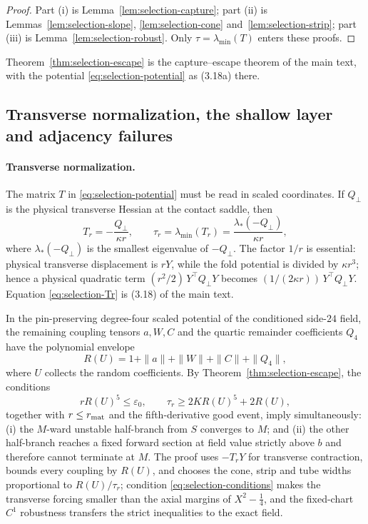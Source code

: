 \begin{proof}
Part (i) is Lemma~\ref{lem:selection-capture}; part (ii) is Lemmas~\ref{lem:selection-slope}, \ref{lem:selection-cone} and~\ref{lem:selection-strip}; part (iii) is Lemma~\ref{lem:selection-robust}. Only $\tau=\lambda_{\min}(T)$ enters these proofs.
\end{proof}

Theorem~\ref{thm:selection-escape} is the capture--escape theorem of the main text, with the potential \eqref{eq:selection-potential} as (3.18a) there.

\subsection{Transverse normalization, the shallow layer and adjacency failures}\label{ssec:selection-adjacency}

\paragraph{Transverse normalization.} The matrix $T$ in \eqref{eq:selection-potential} must be read in scaled coordinates. If $Q_\perp$ is the physical transverse Hessian at the contact saddle, then
\begin{equation}\label{eq:selection-Tr}
T_r=-\frac{Q_\perp}{\kappa r},\qquad\tau_r=\lambda_{\min}(T_r)=\frac{\lambda_*(-Q_\perp)}{\kappa r},
\end{equation}
where $\lambda_*(-Q_\perp)$ is the smallest eigenvalue of $-Q_\perp$. The factor $1/r$ is essential: physical transverse displacement is $rY$, while the fold potential is divided by $\kappa r^3$; hence a physical quadratic term $(r^2/2)\,Y^{\top}Q_\perp Y$ becomes $(1/(2\kappa r))\,Y^{\top}Q_\perp Y$. Equation \eqref{eq:selection-Tr} is (3.18) of the main text.

In the pin-preserving degree-four scaled potential of the conditioned side-$24$ field, the remaining coupling tensors $a,W,C$ and the quartic remainder coefficients $Q_4$ have the polynomial envelope
\begin{equation}\label{eq:selection-RU}
R(U)=1+\|a\|+\|W\|+\|C\|+\|Q_4\|,
\end{equation}
where $U$ collects the random coefficients. By Theorem~\ref{thm:selection-escape}, the conditions
\begin{equation}\label{eq:selection-conditions}
rR(U)^5\le\varepsilon_0,\qquad\tau_r\ge2KR(U)^5+2R(U),
\end{equation}
together with $r\le r_{\rm mat}$ and the fifth-derivative good event, imply simultaneously: (i) the $M$-ward unstable half-branch from $S$ converges to $M$; and (ii) the other half-branch reaches a fixed forward section at field value strictly above $b$ and therefore cannot terminate at $M$. The proof uses $-T_rY$ for transverse contraction, bounds every coupling by $R(U)$, and chooses the cone, strip and tube widths proportional to $R(U)/\tau_r$; condition \eqref{eq:selection-conditions} makes the transverse forcing smaller than the axial margins of $X^2-\frac14$, and the fixed-chart $C^1$ robustness transfers the strict inequalities to the exact field.

